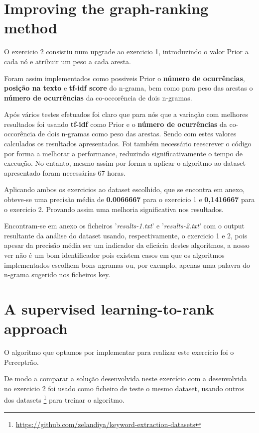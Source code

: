 \documentclass[a4paper,titlepage,11pt]{article}
\begin{document}
\section{Improving the graph-ranking method}
O exercicio 2 consistiu num upgrade ao exercicio 1, introduzindo o valor Prior a cada nó e atribuir um peso a
cada aresta.

Foram assim implementados como possiveis Prior o \textbf{número de ocurrências}, \textbf{posição na texto} e
\textbf{tf-idf score} do n-grama, bem como para peso das arestas o \textbf{número de ocurrências} da co-occorência
de dois n-gramas.

Após vários testes efetuados foi claro que para nós que a variação com melhores resultados foi usando \textbf{tf-idf} como Prior
e o \textbf{número de ocurrências} da co-occorência de dois n-gramas como peso das arestas. Sendo com estes valores calculados
os resultados apresentados. Foi também necessário reescrever o código por forma a melhorar a performance, reduzindo significativamente
o tempo de execução. No entanto, mesmo assim por forma a aplicar o algoritmo ao dataset apresentado foram necessárias 67 horas.

Aplicando ambos os exercicios ao dataset escolhido, que se encontra em anexo, obteve-se uma precisão média de \textbf{0.0066667} para o
exercicio 1 e \textbf{0,1416667} para o exercicio 2. Provando assim uma melhoria significativa nos resultados.

Encontram-se em anexo os ficheiros '\textit{results-1.txt}' e '\textit{results-2.txt}' com o output resultante da análise do dataset
usando, respectivamente, o exercicio 1 e 2, pois apesar da precisão média ser um indicador da eficácia destes algoritmos, a nosso ver
não é um bom identificador pois existem casos em que os algoritmos implementados escolhem bons ngramas ou, por exemplo, apenas uma
palavra do n-grama sugerido nos ficheiros key.

\newpage

\section{A supervised learning-to-rank approach}
O algoritmo que optamos por implementar para realizar este exercício foi o Perceptrão.

De modo a comparar a solução desenvolvida neste exercício com a desenvolvida no exercicio 2
foi usado como  ficheiro de teste o mesmo dataset, usando outros dos datasets
\footnote{ \href{https://github.com/zelandiya/keyword-extraction-datasets}{https://github.com/zelandiya/keyword-extraction-datasets} }
para treinar o algoritmo.
\end{document}
